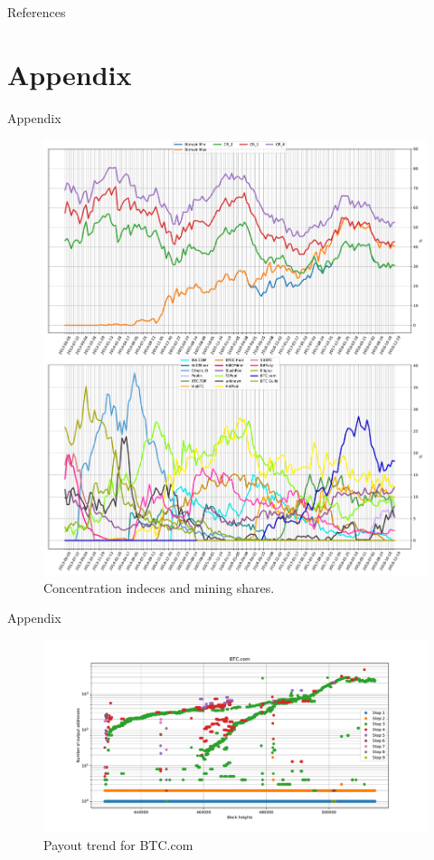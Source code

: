 \documentclass[10pt]{beamer}
\begin{document}
\begin{frame}[allowframebreaks]{References}
  
  
\end{frame}

\section{Appendix}
\begin{frame}[fragile]{Appendix}
    \begin{figure}
        \centering
        \includegraphics[width=.6\textwidth]{images/mining_distribution_157.pdf}
        \caption{Concentration indeces and mining shares.} \label{fig:mining_distribution}
    \end{figure}
\end{frame}

\begin{frame}[fragile]{Appendix}
    \begin{figure}
        \includegraphics[width=\textwidth]{images/payout_trend_BTC_com.pdf}
        \caption{Payout trend for BTC.com} \label{fig:payout_trend_BTCcom}
    \end{figure}
\end{frame}
\end{document}
